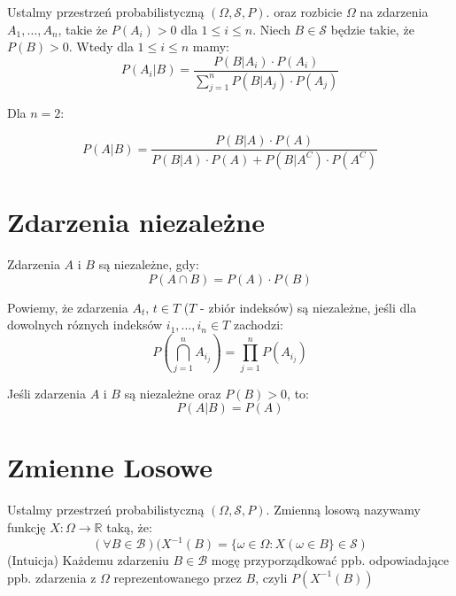 \documentclass{article}
\newenvironment{definition}[1]{%
    \trivlist
    \item[\hskip\labelsep\textbf{Definition. #1.}]
    \ignorespaces
}{%
    \endtrivlist
}
\newenvironment{information}[1]{%
    \trivlist
    \item[\hskip\labelsep\textbf{Information. #1.}]
    \ignorespaces
}{%
    \endtrivlist
}
\begin{document}
\begin{definition}{Wzór Bayesa}
    Ustalmy przestrzeń probabilistyczną $(\Omega, \mathcal{S}, P)$. oraz rozbicie $\Omega$ na zdarzenia $A_1, \dots, A_n$, takie że $P(A_i) > 0$ dla $1 \leq i \leq n$. Niech $B\in\mathcal{S}$ będzie takie, że $P(B)>0$. Wtedy dla $1\leq i\leq n$ mamy:
    \[
        P(A_i|B) = \frac{P(B|A_i)\cdot P(A_i)}{\sum_{j=1}^{n} P(B|A_j) \cdot P(A_j)}
    \]

    Dla $n=2$:

    \[
        P(A|B)=\frac{P(B|A)\cdot P(A)}{P(B|A)\cdot P(A) + P(B|A^C) \cdot P(A^C)}
    \]
\end{definition}

\section{Zdarzenia niezależne}

\begin{definition}{Zdarzenie niezależne}
    Zdarzenia $A$ i $B$ są niezależne, gdy:
    \[
    P(A\cap B) = P(A)\cdot P(B)
    \]

    Powiemy, że zdarzenia $A_t$, $t\in T$ ($T$ - zbiór indeksów) są niezależne, jeśli dla dowolnych róznych indeksów $i_1,\dots, i_n \in T$ zachodzi:
    \[
    P(\bigcap_{j=1}^{n} A_{i_j}) = \prod_{j=1}^{n} P(A_{i_j})
    \]
\end{definition}

\begin{information}{Niezależność, a prawdopodobieństwo warunkowe}
    Jeśli zdarzenia $A$ i $B$ są niezależne oraz $P(B)>0$, to:
    \[
        P(A|B) = P(A)
    \]
\end{information}

\section{Zmienne Losowe}

\begin{definition}{Zmienne Losowe}
    Ustalmy przestrzeń probabilistyczną $(\Omega, \mathcal{S}, P)$. Zmienną losową nazywamy funkcję $X: \Omega \rightarrow \mathbb{R}$ taką, że:
    \[
    (\forall B\in\mathcal{B}) (X^{-1}(B) = \{ \omega \in \Omega: X(\omega \in B\} \in \mathcal{S})
    \]
    (Intuicja) Każdemu zdarzeniu $B\in\mathcal{B}$ mogę przyporządkować ppb. odpowiadające ppb. zdarzenia z $\Omega$ reprezentowanego przez $B$, czyli $P(X^{-1}(B))$ 
\end{definition}
\end{document}
